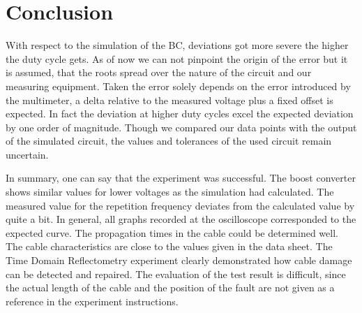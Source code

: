 \chapter{Conclusion}
%
With respect to the simulation of the BC, deviations got more severe the higher the duty cycle gets. As of now we can not
pinpoint the origin of the error but it is assumed, that the roots spread over the nature of the circuit and our measuring equipment.
Taken the error solely depends on the error introduced by the multimeter, a delta relative to the measured voltage plus a
fixed offset is expected. In fact the deviation at higher duty cycles excel the expected deviation by one order of magnitude.
Though we compared our data points with the output of the simulated circuit, the values and tolerances of the used circuit
remain uncertain.

In summary, one can say that the experiment was successful. The boost converter shows similar values for lower voltages
as the simulation had calculated.
The measured value for the repetition frequency deviates from the calculated value by
quite a bit. In general, all graphs recorded at the oscilloscope corresponded to the expected curve. The propagation
times in the cable could be determined well. The cable characteristics are close to the values given in the data sheet.
The Time Domain Reflectometry experiment clearly demonstrated how cable damage can be detected and repaired. The evaluation
of the test result is difficult, since the actual length of the cable and the position of the fault are not given as a
reference in the experiment instructions.